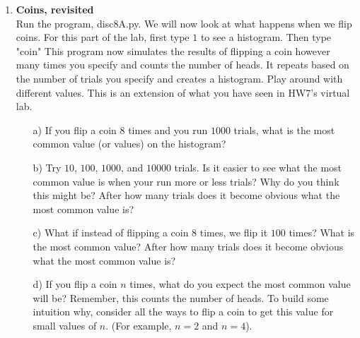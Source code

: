 \documentclass[11pt]{article}
\newif\ifsolutions
\begin{document}
\begin{enumerate}


\item {\bf Coins, revisited}   \\
Run the program, disc8A.py. We will now look at what happens when we flip coins. For this part of the lab, first type $1$ to see a histogram. Then type "coin" This program now simulates the results of flipping a coin however many times you specify and counts the number of heads. It repeats based on the number of trials you specify and creates a histogram. Play around with different values. This is an extension of what you have seen in HW7's virtual lab.

\ifsolutions
{\color{blue}{Motivation: have students see the LLN in action, how adding more trials makes all these distributions look visually more like a normal distribution. Also, if they have matplotlib installed they can uncomment the relevant lines to get better looking histograms.
}}
\fi

\begin{enumerate}
\item[a)] If you flip a coin $8$ times and you run $1000$ trials, what is the most common value (or values) on the histogram? 

\ifsolutions
{\color{blue}{Solution: It is usually $4$.
}}
\begin{figure}
\centering
\texttt{[image: resources/coin\_8\_1000.png]}
\caption{Coin flip 8 times with 1000 trials.}
\end{figure}
\fi

\item[b)] Try $10$, $100$, $1000$, and $10000$ trials. Is it easier to see what the most common value is when your run more or less trials?  Why do you think this might be? After how many trials does it become obvious what the most common value is?

\ifsolutions
{\color{blue}{Solution: After about $100$ trials, we begin to see $4$ as the most common value.
}}
\fi

\item[c)] What if instead of flipping a coin $8$ times, we flip it $100$ times? What is the most common value? After how many trials does it become obvious what the most common value is?

\ifsolutions
{\color{blue}{Solution: The most common value is usually $50$. Also, after about $100$ trials we begin to see $50$ as the most common value. 
}}
\fi

\item[d)] If you flip a coin $n$ times, what do you expect the most common value will be? Remember, this counts the number of heads. To build some intuition why, consider all the ways to flip a coin to get this value for small values of $n$. (For example, $n = 2$ and $n = 4$).


\end{enumerate}
\end{enumerate}
\end{document}
